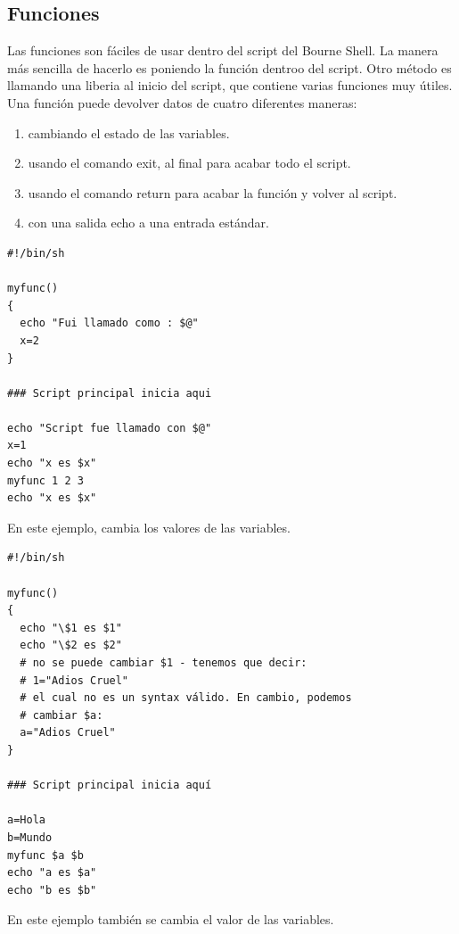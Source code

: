 \documentclass[a4paper]{article}
\begin{document}
\subsection{Funciones}
Las funciones son fáciles de usar dentro del script del Bourne Shell. La manera más sencilla de hacerlo es poniendo la función dentroo del script. Otro método es llamando una liberia al inicio del script, que contiene varias funciones muy útiles.
Una función puede devolver datos de cuatro diferentes maneras:
\begin{enumerate}
\item cambiando el estado de las variables.
\item usando el comando exit, al final para acabar todo el script.
\item usando el comando return para acabar la función y volver al script.
\item con una salida echo a una entrada estándar.
\end{enumerate}

\begin{verbatim}
#!/bin/sh

myfunc()
{
  echo "Fui llamado como : $@"
  x=2
}

### Script principal inicia aqui 

echo "Script fue llamado con $@"
x=1
echo "x es $x"
myfunc 1 2 3
echo "x es $x"
\end{verbatim}
En este ejemplo, cambia los valores de las variables.

\begin{verbatim}
#!/bin/sh

myfunc()
{
  echo "\$1 es $1"
  echo "\$2 es $2"
  # no se puede cambiar $1 - tenemos que decir:
  # 1="Adios Cruel"
  # el cual no es un syntax válido. En cambio, podemos
  # cambiar $a:
  a="Adios Cruel"
}

### Script principal inicia aquí 

a=Hola
b=Mundo
myfunc $a $b
echo "a es $a"
echo "b es $b"
\end{verbatim}
En este ejemplo también se cambia el valor de las variables.
\end{document}
